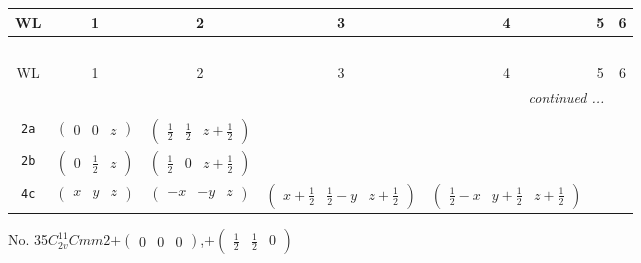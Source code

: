 \documentclass[fleqn,9pt,landscape]{jsarticle}
\begin{document}
\begin{center}
\renewcommand{\arraystretch}{1.2}
\begin{longtable}{ccccccc}
 \hline \hline
WL & 1 & 2 & 3 & 4 & 5 & 6 \\ \hline \endfirsthead

\multicolumn{6}{l}{\tablename\ \thetable{}} \\
 \hline \hline
WL & 1 & 2 & 3 & 4 & 5 & 6 \\ \hline \endhead

 \hline \hline
\multicolumn{6}{r}{\footnotesize\it continued ...} \\ \endfoot

 \hline \hline
\multicolumn{6}{r}{} \\ \endlastfoot

{\tt 2a} & $ \begin{pmatrix} 0 & 0 & z \end{pmatrix} $ & $ \begin{pmatrix} \frac{1}{2} & \frac{1}{2} & z + \frac{1}{2} \end{pmatrix} $ & $  $ & $  $ \\ \hline
{\tt 2b} & $ \begin{pmatrix} 0 & \frac{1}{2} & z \end{pmatrix} $ & $ \begin{pmatrix} \frac{1}{2} & 0 & z + \frac{1}{2} \end{pmatrix} $ & $  $ & $  $ \\ \hline
{\tt 4c} & $ \begin{pmatrix} x & y & z \end{pmatrix} $ & $ \begin{pmatrix} - x & - y & z \end{pmatrix} $ & $ \begin{pmatrix} x + \frac{1}{2} & \frac{1}{2} - y & z + \frac{1}{2} \end{pmatrix} $ & $ \begin{pmatrix} \frac{1}{2} - x & y + \frac{1}{2} & z + \frac{1}{2} \end{pmatrix} $ \\
\end{longtable}
\end{center}
\newpage
No. 35\quad$C_{2v}^{11}$\quad$Cmm2$\quad[ orthorhombic ]\quad$+\begin{pmatrix} 0 & 0 & 0 \end{pmatrix}$,\quad $+\begin{pmatrix} \frac{1}{2} & \frac{1}{2} & 0 \end{pmatrix}$
\end{document}
